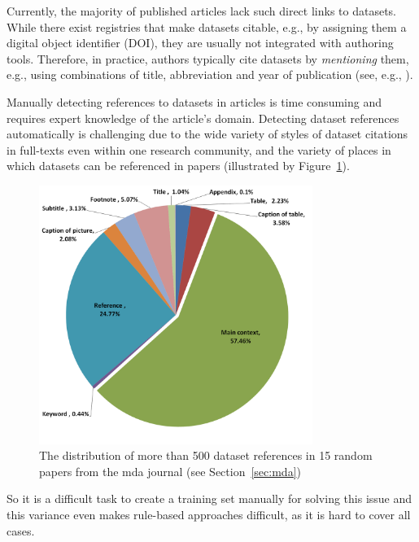 \documentclass{IOS-Book-Article}
\begin{document}
Currently, the majority of published articles lack such direct links to datasets.
While there exist registries that make datasets citable, e.g., by assigning them a digital object identifier (DOI), they are usually not integrated with authoring tools.
Therefore, in practice, authors typically cite datasets by \emph{mentioning} them, e.g., using  
combinations of title, abbreviation and year of publication (see, e.g., \citet{Mathiak2015}).  

Manually detecting references to datasets in articles is time consuming and requires expert knowledge of the article's domain. 
Detecting dataset references automatically is challenging 
due to the wide variety of styles of dataset citations in full-texts even within one research community, and the variety
of places in which datasets can be referenced in papers  
(illustrated by Figure~\ref{fig:places-example}).  
\begin{figure}[h]
	\centering
	\includegraphics[width=3.5in]{DistPlaces4.PNG}
	\caption{The distribution of more than 500 dataset references in 15 random papers from the mda journal (see Section~\ref{sec:mda})}
	\label{fig:places-example}
\end{figure}
So it is a difficult task to create a training set manually for solving this issue and this variance even makes rule-based approaches difficult, as it is hard to cover all cases.
\end{document}
